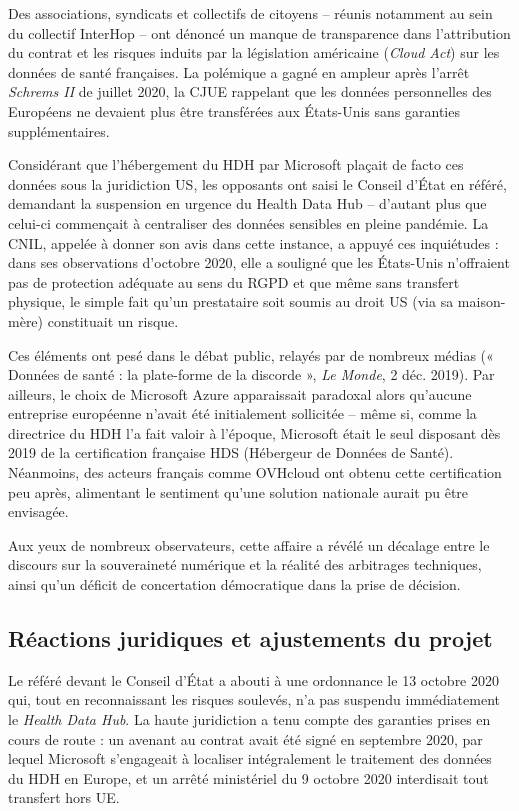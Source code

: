 \documentclass[10pt,a4paper]{article} %
\begin{document}
Des associations, syndicats et collectifs de citoyens – réunis notamment au sein du collectif InterHop – ont dénoncé un manque de transparence dans l’attribution du contrat et les risques induits par la législation américaine (\textit{Cloud Act}) sur les données de santé françaises. La polémique a gagné en ampleur après l’arrêt \textit{Schrems II} de juillet 2020, la CJUE rappelant que les données personnelles des Européens ne devaient plus être transférées aux États-Unis sans garanties supplémentaires.

Considérant que l’hébergement du HDH par Microsoft plaçait de facto ces données sous la juridiction US, les opposants ont saisi le Conseil d’État en référé, demandant la suspension en urgence du Health Data Hub – d’autant plus que celui-ci commençait à centraliser des données sensibles en pleine pandémie. La CNIL, appelée à donner son avis dans cette instance, a appuyé ces inquiétudes : dans ses observations d’octobre 2020, elle a souligné que les États-Unis n’offraient pas de protection adéquate au sens du RGPD et que même sans transfert physique, le simple fait qu’un prestataire soit soumis au droit US (via sa maison-mère) constituait un risque.

Ces éléments ont pesé dans le débat public, relayés par de nombreux médias (« Données de santé : la plate-forme de la discorde », \textit{Le Monde}, 2 déc. 2019). Par ailleurs, le choix de Microsoft Azure apparaissait paradoxal alors qu’aucune entreprise européenne n’avait été initialement sollicitée – même si, comme la directrice du HDH l’a fait valoir à l’époque, Microsoft était le seul disposant dès 2019 de la certification française HDS (Hébergeur de Données de Santé). Néanmoins, des acteurs français comme OVHcloud ont obtenu cette certification peu après, alimentant le sentiment qu’une solution nationale aurait pu être envisagée.

Aux yeux de nombreux observateurs, cette affaire a révélé un décalage entre le discours sur la souveraineté numérique et la réalité des arbitrages techniques, ainsi qu’un déficit de concertation démocratique dans la prise de décision.


\subsection{Réactions juridiques et ajustements du projet}

Le référé devant le Conseil d’État a abouti à une ordonnance le 13 octobre 2020 qui, tout en reconnaissant les risques soulevés, n’a pas suspendu immédiatement le \textit{Health Data Hub}. La haute juridiction a tenu compte des garanties prises en cours de route : un avenant au contrat avait été signé en septembre 2020, par lequel Microsoft s’engageait à localiser intégralement le traitement des données du HDH en Europe, et un arrêté ministériel du 9 octobre 2020 interdisait tout transfert hors UE.
\end{document}
